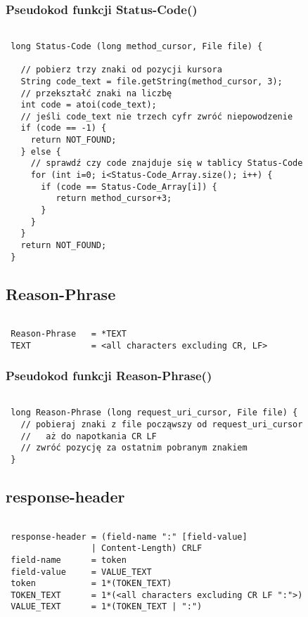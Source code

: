 \documentclass[a4paper,11pt]{report}
\begin{document}
\subsubsection{Pseudokod funkcji Status-Code()}

\begin{lstlisting}

 long Status-Code (long method_cursor, File file) {
   
   // pobierz trzy znaki od pozycji kursora
   String code_text = file.getString(method_cursor, 3);
   // przekształć znaki na liczbę
   int code = atoi(code_text);
   // jeśli code_text nie trzech cyfr zwróć niepowodzenie   
   if (code == -1) {
     return NOT_FOUND;
   } else {
     // sprawdź czy code znajduje się w tablicy Status-Code
     for (int i=0; i<Status-Code_Array.size(); i++) {
       if (code == Status-Code_Array[i]) {
          return method_cursor+3;
       }
     }
   }  
   return NOT_FOUND;
 }

\end{lstlisting}

\subsection{Reason-Phrase}

\begin{lstlisting}

 Reason-Phrase   = *TEXT 
 TEXT            = <all characters excluding CR, LF>

\end{lstlisting}

\subsubsection{Pseudokod funkcji Reason-Phrase()}

\begin{lstlisting}

 long Reason-Phrase (long request_uri_cursor, File file) {
   // pobieraj znaki z file począwszy od request_uri_cursor
   //   aż do napotkania CR LF
   // zwróć pozycję za ostatnim pobranym znakiem
 }

\end{lstlisting}

\subsection{response-header}

\begin{lstlisting}

 response-header = (field-name ":" [field-value] 
                 | Content-Length) CRLF
 field-name      = token
 field-value     = VALUE_TEXT
 token           = 1*(TOKEN_TEXT)
 TOKEN_TEXT      = 1*(<all characters excluding CR LF ":">)
 VALUE_TEXT      = 1*(TOKEN_TEXT | ":")

\end{lstlisting}
\end{document}

